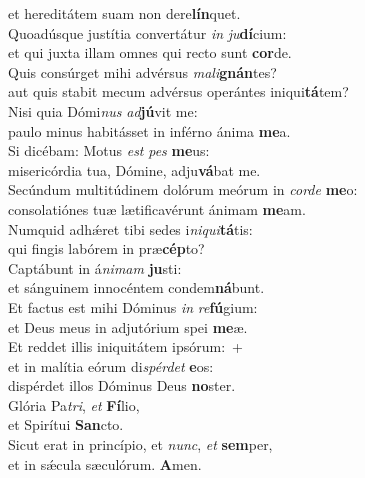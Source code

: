 \evenverse et hereditátem suam non dere\textbf{lín}quet.\\
\oddverse Quoadúsque justítia convertátur \textit{in} \textit{ju}\textbf{dí}cium:~\*\\
\oddverse et qui juxta illam omnes qui recto sunt \textbf{cor}de.\\
\evenverse Quis consúrget mihi advérsus \textit{ma}\textit{li}\textbf{gnán}tes?~\*\\
\evenverse aut quis stabit mecum advérsus operántes iniqui\textbf{tá}tem?\\
\oddverse Nisi quia Dómi\textit{nus} \textit{ad}\textbf{jú}vit me:~\*\\
\oddverse paulo minus habitásset in inférno ánima \textbf{me}a.\\
\evenverse Si dicébam: Motus \textit{est} \textit{pes} \textbf{me}us:~\*\\
\evenverse misericórdia tua, Dómine, adju\textbf{vá}bat me.\\
\oddverse Secúndum multitúdinem dolórum meórum in \textit{cor}\textit{de} \textbf{me}o:~\*\\
\oddverse consolatiónes tuæ lætificavérunt ánimam \textbf{me}am.\\
\evenverse Numquid adhǽret tibi sedes i\textit{ni}\textit{qui}\textbf{tá}tis:~\*\\
\evenverse qui fingis labórem in præ\textbf{cép}to?\\
\oddverse Captábunt in á\textit{ni}\textit{mam} \textbf{ju}sti:~\*\\
\oddverse et sánguinem innocéntem condem\textbf{ná}bunt.\\
\evenverse Et factus est mihi Dóminus \textit{in} \textit{re}\textbf{fú}gium:~\*\\
\evenverse et Deus meus in adjutórium spei \textbf{me}æ.\\
\oddverse Et reddet illis iniquitátem ipsórum:~+\\
\oddverse  et in malítia eórum di\textit{spér}\textit{det} \textbf{e}os:~\*\\
\oddverse dispérdet illos Dóminus Deus \textbf{no}ster.\\
\evenverse Glória Pa\textit{tri}, \textit{et} \textbf{Fí}lio,~\*\\
\evenverse et Spirítui \textbf{San}cto.\\
\oddverse Sicut erat in princípio, et \textit{nunc}, \textit{et} \textbf{sem}per,~\*\\
\oddverse et in sǽcula sæculórum. \textbf{A}men.\\
